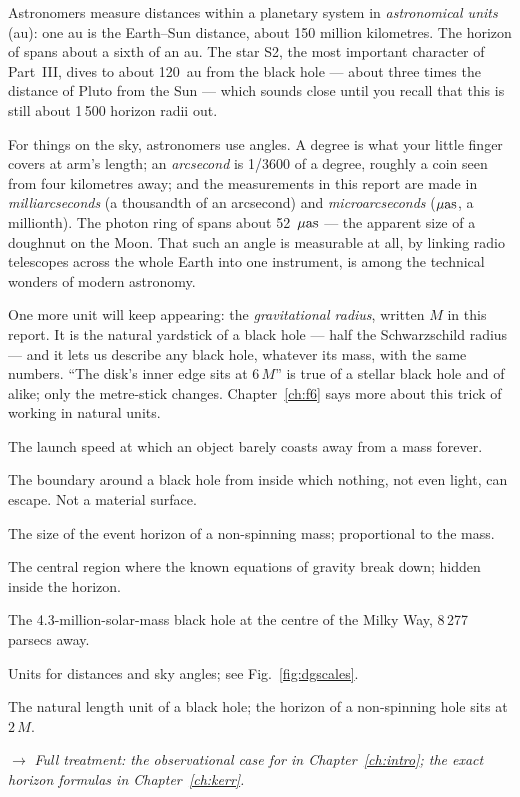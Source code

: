 Astronomers measure distances within a planetary system in
\emph{astronomical units} (au): one au is the Earth–Sun distance, about 150
million kilometres. The horizon of \sgra{} spans about a sixth of an
au. The star S2, the most important character of Part~III, dives to about
120~au from the black hole — about three times the distance of Pluto from
the Sun — which sounds close until you recall that this is still about
1\,500 horizon radii out.

For things on the sky, astronomers use angles. A degree is what your little
finger covers at arm's length; an \emph{arcsecond} is 1/3600 of a degree,
roughly a coin seen from four kilometres away; and the measurements in this
report are made in \emph{milliarcseconds} (a thousandth of an arcsecond)
and \emph{microarcseconds} ($\mu\mathrm{as}$, a millionth). The photon ring of
\sgra{} spans about 52~$\mu\mathrm{as}$ — the apparent size of a doughnut on the
Moon. That such an angle is measurable at all, by linking radio telescopes
across the whole Earth into one instrument, is among the technical wonders
of modern astronomy.

One more unit will keep appearing: the \emph{gravitational radius}, written
$M$ in this report. It is the natural yardstick of a black hole — half the
Schwarzschild radius — and it lets us describe any black hole, whatever
its mass, with the same numbers. ``The disk's inner edge sits at $6\,M$''
is true of a stellar black hole and of \sgra{} alike; only the metre-stick
changes. Chapter~\ref{ch:f6} says more about this trick of working in
natural units.

\begin{termsbox}
\item[Escape velocity] The launch speed at which an object barely coasts
away from a mass forever.
\item[Event horizon] The boundary around a black hole from inside which
nothing, not even light, can escape. Not a material surface.
\item[Schwarzschild radius] The size of the event horizon of a
non-spinning mass; proportional to the mass.
\item[Singularity] The central region where the known equations of gravity
break down; hidden inside the horizon.
\item[\sgra{}] The 4.3-million-solar-mass black hole at the centre of the
Milky Way, 8\,277 parsecs away.
\item[au, parsec, milli-/microarcsecond] Units for distances and sky
angles; see Fig.~\ref{fig:dgscales}.
\item[Gravitational radius ($M$)] The natural length unit of a black hole;
the horizon of a non-spinning hole sits at $2\,M$.
\end{termsbox}

\noindent$\rightarrow$ \emph{Full treatment: the observational case for
\sgra{} in Chapter~\ref{ch:intro}; the exact horizon formulas in
Chapter~\ref{ch:kerr}.}
